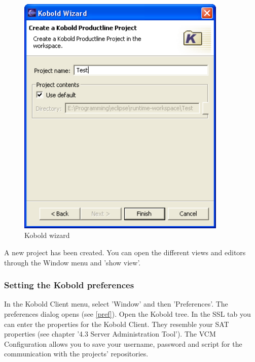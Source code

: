 \begin{figure}[h!]
\begin{center}
\includegraphics[width=10cm]{wizard3.png}
   \caption{Kobold wizard}
\label{wizard3}
\end{center}
\end{figure}\par

A new project has been created. You can open the different views and editors through the Window menu
and 'show view'. 

\subsubsection{Setting the Kobold preferences}
In the Kobold Client menu, select 'Window' and then 'Preferences'. The preferences
dialog opens (see \ref{pref}). Open the Kobold tree. In the SSL tab you can enter the 
properties for the Kobold Client. They resemble your SAT properties (see chapter '4.3 Server 
Administration Tool').
The VCM Configuration allows you to save your username, password and script for the
communication with the projects' repositories.

